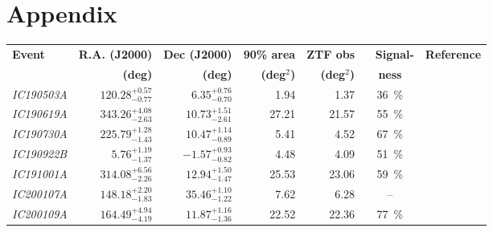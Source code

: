 \appendix

\chapter{Appendix}\label{appendix}
\def\arraystretch{1.5}
\begin{table*}
  \centering
  \small
  \begin{tabular}{l r r r r c c}
    \hline
    \textbf{Event}   & \textbf{R.A. (J2000)}    & \textbf{Dec (J2000)}     & \textbf{90\% area}   & \textbf{ZTF obs}     & ~ \textbf{Signal-} & \textbf{Reference}                                    \\
                     & \textbf{(deg)}           & \textbf{(deg)}           & \textbf{(deg$^{2}$)} & \textbf{(deg$^{2}$)} & \textbf{ness}      &                                                       \\
    \hline
    \hline
    \emph{IC190503A} & $120.28^{+0.57}_{-0.77}$ & $6.35^{+0.76}_{-0.70}$   & 1.94                 & 1.37                 & \SI{36}{\percent}  & \cite{IC190503A1, IC190503A2}                         \\
    \emph{IC190619A} & $343.26^{+4.08}_{-2.63}$ & $10.73^{+1.51}_{-2.61}$  & 27.21                & 21.57                & \SI{55}{\percent}  & \cite{IC190619A1, IC190619A2}                         \\
    \emph{IC190730A} & $225.79^{+1.28}_{-1.43}$ & $10.47^{+1.14}_{-0.89}$  & 5.41                 & 4.52                 & \SI{67}{\percent}  & \cite{IC190730A1, IC190730A2}                         \\
    \emph{IC190922B} & $5.76^{+1.19}_{-1.37}$   & $-1.57^{+0.93}_{-0.82}$  & 4.48                 & 4.09                 & \SI{51}{\percent}  & \cite{IC190922B1, IC190922B2, IC190922B3}             \\
    \emph{IC191001A} & $314.08^{+6.56}_{-2.26}$ & $12.94^{+1.50}_{-1.47}$  & 25.53                & 23.06                & \SI{59}{\percent}  & \cite{IC191001A1, IC191001A2, IC191001A3}             \\
    \emph{IC200107A} & $148.18^{+2.20}_{-1.83}$ & $35.46^{+1.10}_{-1.22}$  & 7.62                 & 6.28                 & --                 & \cite{IC200107A1, IC200107A2}                         \\
    \emph{IC200109A} & $164.49^{+4.94}_{-4.19}$ & $11.87^{+1.16}_{-1.36}$  & 22.52                & 22.36                & \SI{77}{\percent}  & \cite{IC200109A1, IC200109A2}                         \\

\end{tabular}
\end{table*}
